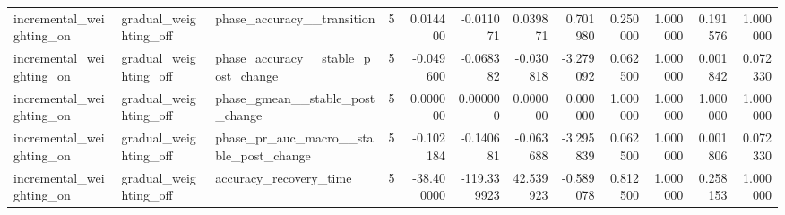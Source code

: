 \begin{tabular}{lllrrrrrrrrr}
incremental\_weighting\_on & gradual\_weighting\_off & phase\_accuracy\_\_transition & 5 & 0.014400 & -0.011071 & 0.039871 & 0.701980 & 0.250000 & 1.000000 & 0.191576 & 1.000000 \\
incremental\_weighting\_on & gradual\_weighting\_off & phase\_accuracy\_\_stable\_post\_change & 5 & -0.049600 & -0.068382 & -0.030818 & -3.279092 & 0.062500 & 1.000000 & 0.001842 & 0.072330 \\
incremental\_weighting\_on & gradual\_weighting\_off & phase\_gmean\_\_stable\_post\_change & 5 & 0.000000 & 0.000000 & 0.000000 & 0.000000 & 1.000000 & 1.000000 & 1.000000 & 1.000000 \\
incremental\_weighting\_on & gradual\_weighting\_off & phase\_pr\_auc\_macro\_\_stable\_post\_change & 5 & -0.102184 & -0.140681 & -0.063688 & -3.295839 & 0.062500 & 1.000000 & 0.001806 & 0.072330 \\
incremental\_weighting\_on & gradual\_weighting\_off & accuracy\_recovery\_time & 5 & -38.400000 & -119.339923 & 42.539923 & -0.589078 & 0.812500 & 1.000000 & 0.258153 & 1.000000 \\
\bottomrule
\end{tabular}
